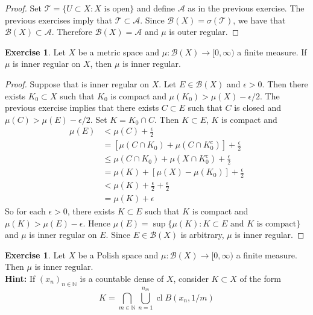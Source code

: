 \documentclass[12pt]{amsart}
\theoremstyle{definition}
\newtheorem{ex}[definition]{Exercise}
\newcommand{\ep}{\epsilon}
\newcommand{\sig}{\sigma}
\newcommand{\N}{\mathbb{N}}
\newcommand{\MA}{\mathcal{A}}
\newcommand{\MB}{\mathcal{B}}
\newcommand{\MT}{\mathcal{T}}
\DeclareMathOperator{\cl}{cl}
\begin{document}
	\begin{proof}
		Set $\MT = \{U \subset X: X \text{ is open}\}$ and define $\MA$ as in the previous exercise. The previous exercises imply that $\MT \subset \MA$. Since $\MB(X) = \sig(\MT)$, we have that $\MB(X) \subset \MA$. Therefore $\MB(X) = \MA$ and $\mu$ is outer regular.  
	\end{proof}

	\begin{ex}
		Let $X$ be a metric space and $\mu: \MB(X) \rightarrow [0, \infty)$ a finite measure. If $\mu$ is inner regular on $X$, then $\mu$ is inner regular.
	\end{ex}

	\begin{proof}
		Suppose that is inner regular on $X$. Let $E \in \MB(X)$ and $\ep >0$. Then there exists $K_0 \subset X$ such that $K_0$ is compact and $\mu(K_0) > \mu(X) - \ep/2$. The previous exercise implies that there exists $C \subset E$ such that $C$ is closed and $\mu(C) > \mu(E) - \ep/2$. Set $K = K_0 \cap C$. Then $K \subset E$, $K$ is compact and 
		\begin{align*}
			\mu(E)
			& < \mu(C) + \frac{\ep}{2} \\
			& =[ \mu(C \cap K_0) + \mu(C \cap K_0^c)] + \frac{\ep}{2} \\
			& \leq \mu(C \cap K_0) + \mu(X \cap K_0^c) + \frac{\ep}{2} \\
			&= \mu(K) + [\mu(X) - \mu(K_0)] + \frac{\ep}{2} \\
			&< \mu(K) + \frac{\ep}{2} + \frac{\ep}{2} \\
			&= \mu(K) + \ep
		\end{align*}
		So for each $\ep >0$, there exists $K \subset E$ such that $K$ is compact and $\mu(K) > \mu(E) - \ep$. Hence $\mu(E) = \sup\{\mu(K): K \subset E \text{ and  $K$ is compact}\}$ and $\mu$ is inner regular on $E$. Since $E \in \MB(X)$ is arbitrary, $\mu$ is inner regular.
	\end{proof}

	\begin{ex}
		Let $X$ be a Polish space and $\mu: \MB(X) \rightarrow [0, \infty)$ a finite measure. Then $\mu$ is inner regular. \\
		\textbf{Hint:} If $(x_{n})_{n \in \N}$ is a countable dense of $X$, consider $K \subset X$ of the form 
		$$K = \bigcap\limits_{m \in \N} \bigcup\limits_{n = 1}^{n_m} \cl B(x_n, 1/m) $$
	\end{ex}
\end{document}
